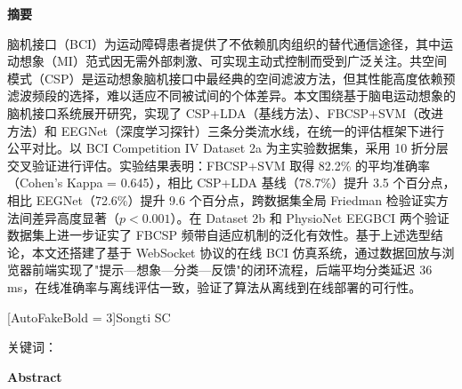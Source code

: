 \clearpage
\setcounter{page}{1}
\vspace*{24pt}
\begin{center}
	\heiti{}\bfseries 摘要
\end{center}
\vspace*{18pt}

{}

\setlength{\baselineskip}{25pt}\setlength{\parindent}{2em}
脑机接口（BCI）为运动障碍患者提供了不依赖肌肉组织的替代通信途径，其中运动想象（MI）范式因无需外部刺激、可实现主动式控制而受到广泛关注。共空间模式（CSP）是运动想象脑机接口中最经典的空间滤波方法，但其性能高度依赖预滤波频段的选择，难以适应不同被试间的个体差异。本文围绕基于脑电运动想象的脑机接口系统展开研究，实现了 CSP+LDA（基线方法）、FBCSP+SVM（改进方法）和 EEGNet（深度学习探针）三条分类流水线，在统一的评估框架下进行公平对比。以 BCI Competition IV Dataset 2a 为主实验数据集，采用 10 折分层交叉验证进行评估。实验结果表明：FBCSP+SVM 取得 82.2\% 的平均准确率（Cohen's Kappa = 0.645），相比 CSP+LDA 基线（78.7\%）提升 3.5 个百分点，相比 EEGNet（72.6\%）提升 9.6 个百分点，跨数据集全局 Friedman 检验证实方法间差异高度显著（$p < 0.001$）。在 Dataset 2b 和 PhysioNet EEGBCI 两个验证数据集上进一步证实了 FBCSP 频带自适应机制的泛化有效性。基于上述选型结论，本文还搭建了基于 WebSocket 协议的在线 BCI 仿真系统，通过数据回放与浏览器前端实现了"提示—想象—分类—反馈"的闭环流程，后端平均分类延迟 36\,ms，在线准确率与离线评估一致，验证了算法从离线到在线部署的可行性。

[AutoFakeBold = {3}]{Songti SC}
\newcommand*{\sdnusongtiBold}{}

\vspace*{14pt}
{\sdnusongtiBold 关键词\songti ：\sdnukeywchs}
\vspace*{18pt}

\clearpage
{}

\vspace*{24pt}
\begin{center}
	\textrm{\bfseries Abstract}
\end{center}
\vspace*{18pt}

